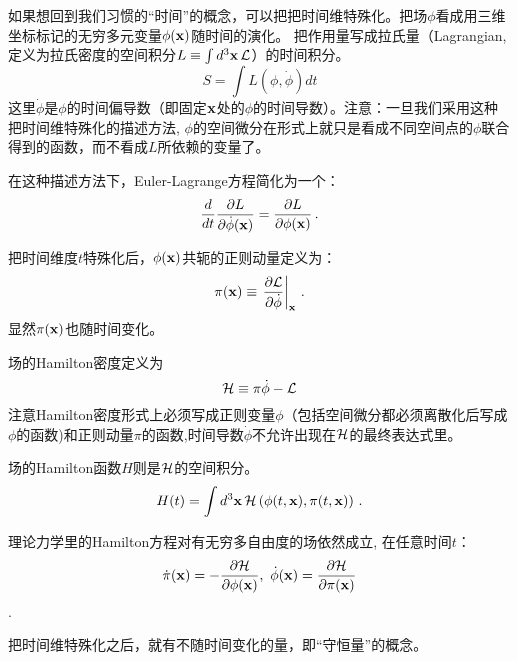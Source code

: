 \documentclass[CJK]{beamer}
\begin{document}
\begin{frame}
\bch
如果想回到我们习惯的“时间”的概念，可以把把时间维特殊化。把场$\phi$看成用三维坐标标记的无穷多元变量$\phi(\mathbf{x})$随时间的演化。
把作用量写成拉氏量（Lagrangian, 定义为拉氏密度的空间积分$L \equiv \int d^3\mathbf{x}\, \mathcal{L}$）的时间积分。
$$S = \int L(\phi,\dot\phi) dt$$
这里$\dot\phi$是$\phi$的时间偏导数（即固定$\mathbf{x}$处的$\phi$的时间导数）。注意：一旦我们采用这种把时间维特殊化的描述方法, $\phi$的空间微分在形式上就只是看成不同空间点的$\phi$联合得到的函数，而不看成$L$所依赖的变量了。

在这种描述方法下，Euler-Lagrange方程简化为一个：
$$\frac{d}{dt} \frac{\partial L}{\partial \dot\phi(\mathbf{x})} = \frac{\partial L}{\partial \phi(\mathbf{x})}\,.$$

\skipline

\ech
\end{frame}


\begin{frame}
\bch
把时间维度$t$特殊化后，$\phi(\mathbf{x})$共轭的正则动量定义为：
$$ \pi(\mathbf{x}) \equiv \left.\frac{\partial\mathcal{L}}{\partial\dot\phi}\right\vert_{\mathbf{x}} \,.$$
显然$\pi(\mathbf{x})$也随时间变化。

场的Hamilton密度定义为
$$ \mathcal{H} \equiv \pi \dot\phi- \mathcal{L} $$
注意Hamilton密度形式上必须写成正则变量$\phi$（包括空间微分都必须离散化后写成$\phi$的函数)和正则动量$\pi$的函数,时间导数$\dot\phi$不允许出现在$\mathcal{H}$的最终表达式里。

场的Hamilton函数$H$则是$\mathcal{H}$的空间积分。
$$ H(t) = \int d^3\mathbf{x}\, \mathcal{H}\left(\phi(t,\mathbf{x}), \pi(t,\mathbf{x})\right)\,.$$
\ech
\end{frame}

\begin{frame}
\bch
理论力学里的Hamilton方程对有无穷多自由度的场依然成立, 在任意时间$t$：
$$\dot\pi(\mathbf{x}) = -\frac{\partial \mathcal{H}}{\partial\phi(\mathbf{x})},\ \dot\phi(\mathbf{x}) = \frac{\partial\mathcal{H}}{\partial\pi(\mathbf{x})}$$.
\ech
\end{frame}

\begin{frame}
把时间维特殊化之后，就有不随时间变化的量，即“守恒量”的概念。
\end{frame}
\end{document}
